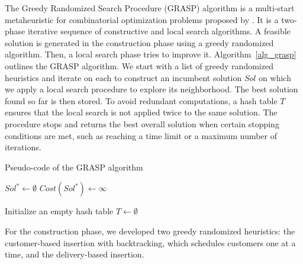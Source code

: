 \documentclass{article}
\begin{document}
The Greedy Randomized Search Procedure (GRASP) algorithm is a multi-start metaheuristic for combinatorial optimization problems proposed by \cite{feo1989probabilistic}. It is a two-phase iterative sequence of constructive and local search algorithms. A feasible solution is generated in the construction phase using a greedy randomized algorithm. Then, a local search phase tries to improve it. Algorithm~\ref{alg_grasp} outlines the GRASP algorithm. We start with a list of greedy randomized heuristics and iterate on each to construct an incumbent solution $Sol$ on which we apply a local search procedure to explore its neighborhood. The best solution found so far is then stored. To avoid redundant computations, a hash table $T$ ensures that the local search is not applied twice to the same solution. The procedure stops and returns the best overall solution when certain stopping conditions are met, such as reaching a time limit or a maximum number of iterations. 
    \begin{algorithm}[hbpt]
        \caption{Pseudo-code of the GRASP algorithm }
        \label{alg_grasp}
        \DontPrintSemicolon
        \LinesNumbered
        \setcounter{AlgoLine}{0}
        $Sol^{*} \leftarrow \emptyset$    \hspace{2mm}        $Cost(Sol^*) \leftarrow \infty$

        Initialize an empty hash table $T \leftarrow \emptyset$



    \end{algorithm}
            
For the construction phase, we developed two greedy randomized heuristics: the customer-based insertion with backtracking, which schedules customers one at a time, and the delivery-based insertion.%
\end{document}
